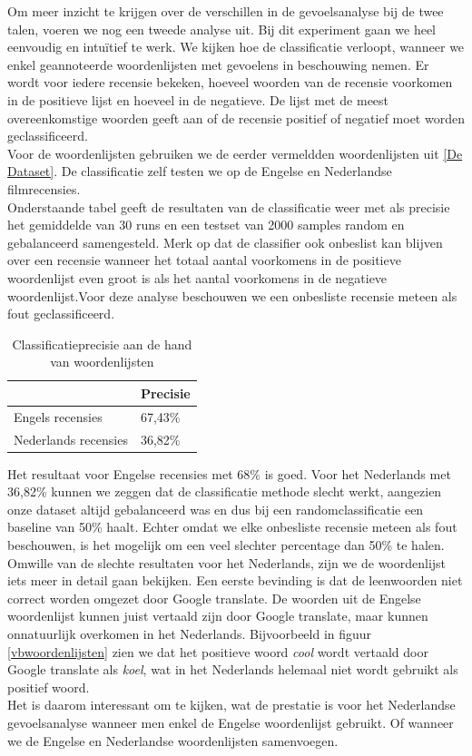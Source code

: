 Om meer inzicht te krijgen over de verschillen in de gevoelsanalyse bij de twee talen, voeren we nog een tweede analyse uit. Bij dit experiment gaan we heel eenvoudig en intu\"itief te werk. We kijken hoe de classificatie verloopt, wanneer we enkel geannoteerde woordenlijsten met gevoelens in beschouwing nemen. Er wordt voor iedere recensie bekeken, hoeveel woorden van de recensie voorkomen in de positieve lijst en hoeveel in de negatieve. De lijst met de meest overeenkomstige woorden geeft aan of de recensie positief of negatief moet worden geclassificeerd.\\
Voor de woordenlijsten gebruiken we de eerder vermeldden woordenlijsten uit \ref{De Dataset}. De classificatie zelf testen we op de Engelse en Nederlandse filmrecensies.\\
Onderstaande tabel geeft de resultaten van de classificatie weer met als precisie het gemiddelde van 30 runs en een testset van 2000 samples random en gebalanceerd samengesteld. Merk op dat de classifier ook onbeslist kan blijven over een recensie wanneer het totaal aantal voorkomens in de positieve woordenlijst even groot is als het aantal voorkomens in de negatieve woordenlijst.Voor deze analyse beschouwen we een onbesliste recensie meteen als fout geclassificeerd.

\begin{table}[h]
\centering
\begin{tabular}{l|l|}
\cline{2-2}
                                           & Precisie \\ \hline
\multicolumn{1}{|l|}{Engels recensies}     & 67,43\%  \\ \hline
\multicolumn{1}{|l|}{Nederlands recensies} & 36,82\%   \\ \hline
\end{tabular}
\caption{Classificatieprecisie aan de hand van woordenlijsten}
\end{table}

 Het resultaat voor Engelse recensies met 68\% is goed. Voor het Nederlands met 36,82\% kunnen we zeggen dat de classificatie methode slecht werkt, aangezien onze dataset altijd gebalanceerd was en dus bij een randomclassificatie een baseline van 50\% haalt. Echter omdat we elke onbesliste recensie meteen als fout beschouwen, is het mogelijk om een veel slechter percentage dan 50\% te halen.\\
 Omwille van de slechte resultaten voor het Nederlands, zijn we de woordenlijst iets meer in detail gaan bekijken. Een eerste bevinding is dat de leenwoorden niet correct worden omgezet door Google translate. De woorden uit de Engelse woordenlijst kunnen juist vertaald zijn door Google translate, maar kunnen onnatuurlijk overkomen in het Nederlands. Bijvoorbeeld in figuur \ref{vbwoordenlijsten} zien we dat het positieve woord \textit{cool} wordt vertaald door Google translate als \textit{koel}, wat in het Nederlands helemaal niet wordt gebruikt als positief woord.\\
 Het is daarom interessant om te kijken, wat de prestatie is voor het Nederlandse gevoelsanalyse wanneer men enkel de Engelse woordenlijst gebruikt. Of wanneer we de Engelse en Nederlandse woordenlijsten samenvoegen.

